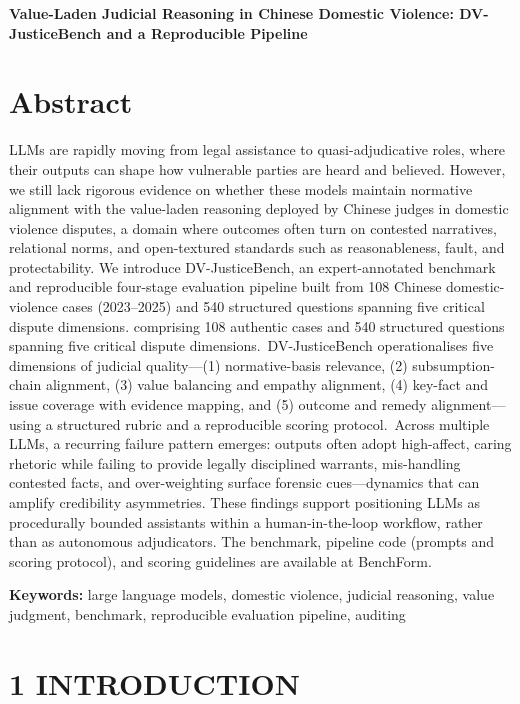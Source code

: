 \textbf{Value-Laden Judicial Reasoning in Chinese Domestic Violence: DV-JusticeBench and a Reproducible Pipeline}

\hypertarget{abstract}{%
\section{\texorpdfstring{\textbf{Abstract}}{Abstract}}\label{abstract}}

LLMs are rapidly moving from legal assistance to quasi-adjudicative roles, where their outputs can shape how vulnerable parties are heard and believed. However, we still lack rigorous evidence on whether these models maintain normative alignment with the value-laden reasoning deployed by Chinese judges in domestic violence disputes, a domain where outcomes often turn on contested narratives, relational norms, and open-textured standards such as reasonableness, fault, and protectability. We introduce DV-JusticeBench, an expert-annotated benchmark and reproducible four-stage evaluation pipeline built from 108 Chinese domestic-violence cases (2023--2025) and 540 structured questions spanning five critical dispute dimensions. comprising 108 authentic cases and 540 structured questions spanning five critical dispute dimensions.~DV-JusticeBench operationalises five dimensions of judicial quality---(1) normative-basis relevance, (2) subsumption-chain alignment, (3) value balancing and empathy alignment, (4) key-fact and issue coverage with evidence mapping, and (5) outcome and remedy alignment---using a structured rubric and a reproducible scoring protocol.~Across multiple LLMs, a recurring failure pattern emerges: outputs often adopt high-affect, caring rhetoric while failing to provide legally disciplined warrants, mis-handling contested facts, and over-weighting surface forensic cues---dynamics that can amplify credibility asymmetries. These findings support positioning LLMs as procedurally bounded assistants within a human-in-the-loop workflow, rather than as autonomous adjudicators. The benchmark, pipeline code (prompts and scoring protocol), and scoring guidelines are available at BenchForm.

\textbf{Keywords:} large language models, domestic violence, judicial reasoning, value judgment, benchmark, reproducible evaluation pipeline, auditing

\hypertarget{introduction}{%
\section{\texorpdfstring{\textbf{1 INTRODUCTION}}{1 INTRODUCTION}}\label{introduction}}

